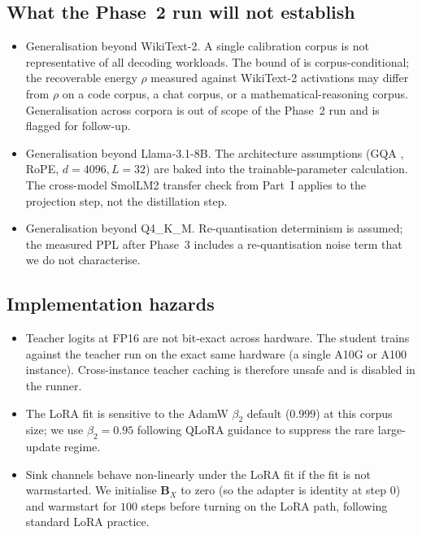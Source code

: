 \documentclass[11pt]{article}
\providecommand{\Bmat}{\mathbf{B}}
\begin{document}
\subsection{What the Phase~2 run will not establish}
\begin{itemize}
\item Generalisation beyond WikiText-2. A single calibration corpus is
      not representative of all decoding workloads. The bound of
       is corpus-conditional; the recoverable energy
      $\rho$ measured against WikiText-2 activations may differ from
      $\rho$ on a code corpus, a chat corpus, or a mathematical-reasoning
      corpus. Generalisation across corpora is out of scope of the
      Phase~2 run and is flagged for follow-up.
\item Generalisation beyond Llama-3.1-8B. The architecture
      assumptions (GQA \cite{ainslie2023gqa}, RoPE, $d{=}4096, L{=}32$)
      are baked into the trainable-parameter calculation. The
      cross-model SmolLM2 transfer check from Part~I applies to the
      projection step, not the distillation step.
\item Generalisation beyond Q4\_K\_M. Re-quantisation determinism is
      assumed; the measured PPL after Phase~3 includes a
      re-quantisation noise term that we do not characterise.
\end{itemize}

\subsection{Implementation hazards}
\begin{itemize}
\item Teacher logits at FP16 are not bit-exact across hardware. The
      student trains against the teacher run on the exact same hardware
      (a single A10G or A100 instance). Cross-instance teacher caching
      is therefore unsafe and is disabled in the runner.
\item The LoRA fit is sensitive to the AdamW $\beta_2$ default
      ($0.999$) at this corpus size; we use $\beta_2{=}0.95$ following
      QLoRA \cite{dettmers2023qlora} guidance to suppress the rare
      large-update regime.
\item Sink channels behave non-linearly under the LoRA fit if the
      fit is not warmstarted. We initialise $\Bmat_X$ to zero (so the
      adapter is identity at step $0$) and warmstart for $100$ steps
      before turning on the LoRA path, following standard LoRA
      practice.
\end{itemize}
\end{document}

